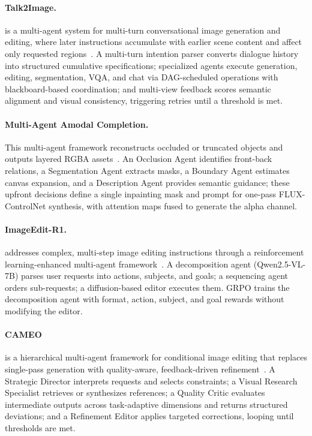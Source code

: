 \paragraph{Talk2Image.}
 is a multi-agent system for multi-turn conversational image generation and editing, where later instructions accumulate with earlier scene content and affect only requested regions~\cite{avg250806916}. A multi-turn intention parser converts dialogue history into structured cumulative specifications; specialized agents execute generation, editing, segmentation, VQA, and chat via DAG-scheduled operations with blackboard-based coordination; and multi-view feedback scores semantic alignment and visual consistency, triggering retries until a threshold is met. 

\paragraph{Multi-Agent Amodal Completion.}
This multi-agent framework reconstructs occluded or truncated objects and outputs layered RGBA assets~\cite{avg250917757}. An Occlusion Agent identifies front-back relations, a Segmentation Agent extracts masks, a Boundary Agent estimates canvas expansion, and a Description Agent provides semantic guidance; these upfront decisions define a single inpainting mask and prompt for one-pass FLUX-ControlNet synthesis, with attention maps fused to generate the alpha channel.

\paragraph{ImageEdit-R1.}
 addresses complex, multi-step image editing instructions through a reinforcement learning-enhanced multi-agent framework~\cite{avg260308059}. A decomposition agent (Qwen2.5-VL-7B) parses user requests into actions, subjects, and goals; a sequencing agent orders sub-requests; a diffusion-based editor executes them. GRPO trains the decomposition agent with format, action, subject, and goal rewards without modifying the editor.

\paragraph{CAMEO}
 is a hierarchical multi-agent framework for conditional image editing that replaces single-pass generation with quality-aware, feedback-driven refinement~\cite{pu2026cameo}. A Strategic Director interprets requests and selects constraints; a Visual Research Specialist retrieves or synthesizes references; a Quality Critic evaluates intermediate outputs across task-adaptive dimensions and returns structured deviations; and a Refinement Editor applies targeted corrections, looping until thresholds are met. 

